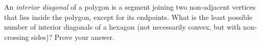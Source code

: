 An \emph{interior diagonal} of a polygon is a segment joining two non-adjacent vertices that lies inside the polygon, except for its endpoints. What is the least possible number of interior diagonals of a hexagon (not necessarily convex, but with non-crossing sides)? Prove your answer.
